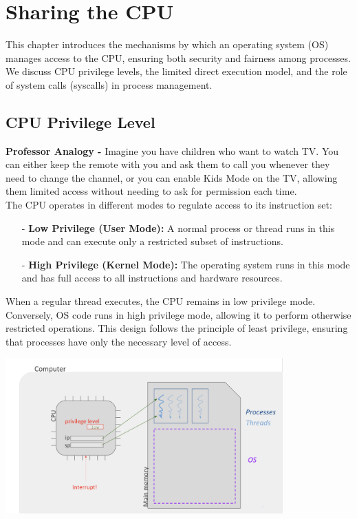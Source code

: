 
\chapter{Sharing the CPU}

This chapter introduces the mechanisms by which an operating system (OS) manages access to the CPU, ensuring both security and fairness among processes. We discuss CPU privilege levels, the limited direct execution model, and the role of system calls (syscalls) in process management.
\vfill
\section{CPU Privilege Level}

\textbf{Professor Analogy -} Imagine you have children who want to watch TV. You can either keep the remote with you and ask them to call you whenever they need to change the channel, or you can enable Kids Mode on the TV, allowing them limited access without needing to ask for permission each time. \\
The CPU operates in different modes to regulate access to its instruction set:
\begin{itemize}
  \item[-] \textbf{Low Privilege (User Mode):} A normal process or thread runs in this mode and can execute only a restricted subset of instructions.
  \item[-] \textbf{High Privilege (Kernel Mode):} The operating system runs in this mode and has full access to all instructions and hardware resources.
\end{itemize}

When a regular thread executes, the CPU remains in low privilege mode. Conversely, OS code runs in high privilege mode, allowing it to perform otherwise restricted operations. This design follows the principle of least privilege, ensuring that processes have only the necessary level of access.

\begin{center}
  \includegraphics[width=0.8\textwidth]{chapters/L3/images/priviledge.png}
\end{center}
\newpage
